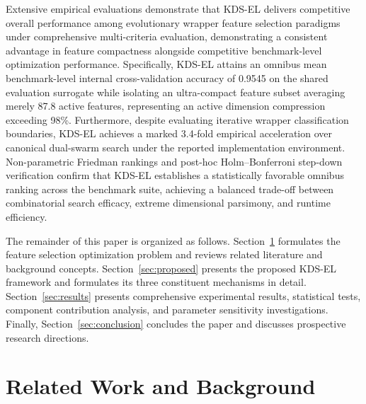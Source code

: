 \documentclass[final,5p,times,fleqn]{elsarticle}
\begin{document}
Extensive empirical evaluations demonstrate that KDS-EL delivers competitive overall performance among evolutionary wrapper feature selection paradigms under comprehensive multi-criteria evaluation, demonstrating a consistent advantage in feature compactness alongside competitive benchmark-level optimization performance. Specifically, KDS-EL attains an omnibus mean benchmark-level internal cross-validation accuracy of 0.9545 on the shared evaluation surrogate while isolating an ultra-compact feature subset averaging merely 87.8 active features, representing an active dimension compression exceeding 98\%. Furthermore, despite evaluating iterative wrapper classification boundaries, KDS-EL achieves a marked 3.4-fold empirical acceleration over canonical dual-swarm search under the reported implementation environment. Non-parametric Friedman rankings and post-hoc Holm--Bonferroni step-down verification confirm that KDS-EL establishes a statistically favorable omnibus ranking across the benchmark suite, achieving a balanced trade-off between combinatorial search efficacy, extreme dimensional parsimony, and runtime efficiency.

The remainder of this paper is organized as follows. Section~\ref{sec:related} formulates the feature selection optimization problem and reviews related literature and background concepts. Section~\ref{sec:proposed} presents the proposed KDS-EL framework and formulates its three constituent mechanisms in detail. Section~\ref{sec:results} presents comprehensive experimental results, statistical tests, component contribution analysis, and parameter sensitivity investigations. Finally, Section~\ref{sec:conclusion} concludes the paper and discusses prospective research directions.

\section{Related Work and Background}\label{sec:related}
\end{document}
